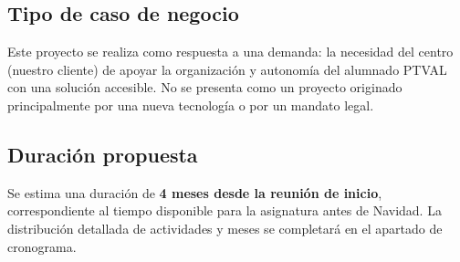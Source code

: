 \subsection{Tipo de caso de negocio}
Este proyecto se realiza como respuesta a una demanda: la necesidad del centro (nuestro cliente) de apoyar la organización y autonomía del alumnado PTVAL con una solución accesible. No se presenta como un proyecto originado principalmente por una nueva tecnología o por un mandato legal.

\subsection{Duración propuesta}
Se estima una duración de \textbf{4 meses desde la reunión de inicio}, correspondiente al tiempo disponible para la asignatura antes de Navidad. La distribución detallada de actividades y meses se completará en el apartado de cronograma.

